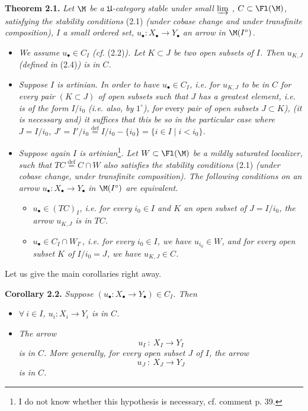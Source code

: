 \textbf{Theorem 2.1.} \textit{Let $\M$ be a $\mathfrak{U}$-category stable under small $\varinjlim$ , $C \subset \Fl(\M)$, satisfying the stability conditions} \textup{(2.1)} \textit{(under cobase change and under transfinite composition), $I$ a small ordered set, $u_\bullet : X_\bullet \longrightarrow Y_\bullet$ an arrow in $\M(I^\circ)$.}
\begin{itemize}[leftmargin=3em]
\item[$1^\circ$)] \textit{We assume $u_\bullet \in C_I$ (cf.} \textup{(2.2)}\textit{). Let $K \subset J$ be two open subsets of $I$. Then $u_{K,J}$ (defined in} \textup{(2.4)}\textit{) is in $C$.}
\item[$2^\circ$)] \textit{Suppose $I$ is artinian. In order to have $u_\bullet \in C_I$, i.e. for $u_{K,J}$ to be in $C$ for every pair $(K \subset J)$ of open subsets such that $J$ has a greatest element, i.e. is of the form $I/i_0$ (i.e. also, by} $1^\circ$\textit{), for} \textup{every} \textit{pair of open subsets $J \subset K$), (it is necessary and) it suffices that this be so in the particular case where $J = I/i_0$, $J' = I'/i_0 \overset{\text{def}}{=} I/i_0 - \{i_0\} = \{i \in I \mid i < i_0\}$.}

\item[$3^\circ$)] \textit{Suppose again $I$ is artinian}\footnote[11]{I do not know whether this hypothesis is necessary, cf. comment p. 39.}\textit{. Let $W \subset \Fl(\M)$ be a mildly saturated localizer, such that $TC \overset{\text{def}}{=} C \cap W$ also satisfies the stability conditions} \textup{(2.1)} \textit{(under cobase change, under transfinite composition). The following conditions on an arrow $u_\bullet : X_\bullet \longrightarrow Y_\bullet$ in $\M(I^\circ)$ are equivalent.}
\begin{itemize}[leftmargin=2em]
\item[a)] \textit{$u_\bullet \in (TC)_I$, i.e. for every $i_0 \in I$ and $K$ an open subset of $J = I/i_0$, the arrow $u_{K,J}$ is in $TC$.}
\item[b)] \textit{$u_\bullet \in C_I \cap W_{I^\circ}$, i.e. for every $i_0 \in I$, we have $u_{i_0} \in W$, and for every open subset $K$ of $I/i_0 = J$, we have $u_{K,J} \in C$.}
\end{itemize}
\end{itemize}

Let us give the main corollaries right away.

\textbf{Corollary 2.2.} \textit{Suppose $(u_\bullet : X_\bullet \longrightarrow Y_\bullet) \in C_I$. Then}
\begin{itemize}[leftmargin=3em]
\item[a)] \textit{$\forall\ i \in I$, $u_i : X_i \longrightarrow Y_i$ is in $C$.}
\item[b)] \textit{The arrow}
\[
u_I \ :\ X_I \longrightarrow Y_I
\tag*{(2.2.1)}
\]
\textit{is in $C$. More generally, for every open subset $J$ of $I$, the arrow}
\[
u_J \ :\ X_J \longrightarrow Y_J
\tag*{(2.2.2)}
\]
\textit{is in $C$.}
\end{itemize}

